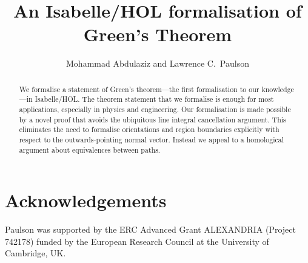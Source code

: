 \documentclass[11pt,a4paper]{article}
\begin{document}
\title{An Isabelle/HOL formalisation of Green's Theorem}
\author{Mohammad Abdulaziz and Lawrence C.\ Paulson}
\maketitle

\begin{abstract}
  We formalise a statement of Green’s theorem—the first formalisation to
  our knowledge—in Isabelle/HOL. The theorem statement that we formalise
  is enough for most applications, especially in physics and
  engineering. Our formalisation is made possible by a novel proof that
  avoids the ubiquitous line integral cancellation argument. This
  eliminates the need to formalise orientations and region boundaries
  explicitly with respect to the outwards-pointing normal vector.
  Instead we appeal to a homological argument about equivalences between
  paths.
\end{abstract}


\section{Acknowledgements}
Paulson was supported by the ERC Advanced Grant ALEXANDRIA (Project 742178) funded by the European Research Council
at the University of Cambridge, UK.





\end{document}
